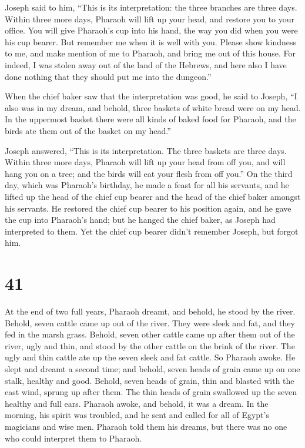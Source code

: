  Joseph said to him, ``This is its interpretation: the
three branches are three days.  Within three more days,
Pharaoh will lift up your head, and restore you to your office. You will
give Pharaoh's cup into his hand, the way you did when you were his cup
bearer.  But remember me when it is well with you. Please
show kindness to me, and make mention of me to Pharaoh, and bring me out
of this house.  For indeed, I was stolen away out of the
land of the Hebrews, and here also I have done nothing that they should
put me into the dungeon.''

 When the chief baker saw that the interpretation was good,
he said to Joseph, ``I also was in my dream, and behold, three baskets
of white bread were on my head.  In the uppermost basket
there were all kinds of baked food for Pharaoh, and the birds ate them
out of the basket on my head.''

 Joseph answered, ``This is its interpretation. The three
baskets are three days.  Within three more days, Pharaoh
will lift up your head from off you, and will hang you on a tree; and
the birds will eat your flesh from off you.''  On the third
day, which was Pharaoh's birthday, he made a feast for all his servants,
and he lifted up the head of the chief cup bearer and the head of the
chief baker amongst his servants.  He restored the chief
cup bearer to his position again, and he gave the cup into Pharaoh's
hand;  but he hanged the chief baker, as Joseph had
interpreted to them.  Yet the chief cup bearer didn't
remember Joseph, but forgot him.

\hypertarget{section-40}{%
\section{41}\label{section-40}}

 At the end of two full years, Pharaoh dreamt, and behold,
he stood by the river.  Behold, seven cattle came up out of
the river. They were sleek and fat, and they fed in the marsh grass.
 Behold, seven other cattle came up after them out of the
river, ugly and thin, and stood by the other cattle on the brink of the
river.  The ugly and thin cattle ate up the seven sleek and
fat cattle. So Pharaoh awoke.  He slept and dreamt a second
time; and behold, seven heads of grain came up on one stalk, healthy and
good.  Behold, seven heads of grain, thin and blasted with
the east wind, sprung up after them.  The thin heads of
grain swallowed up the seven healthy and full ears. Pharaoh awoke, and
behold, it was a dream.  In the morning, his spirit was
troubled, and he sent and called for all of Egypt's magicians and wise
men. Pharaoh told them his dreams, but there was no one who could
interpret them to Pharaoh.

